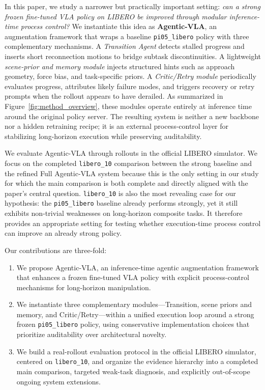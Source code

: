 \documentclass[a4paper]{Template/LaTeX_Templates/waica}
\begin{document}
In this paper, we study a narrower but practically important setting: \emph{can a strong frozen fine-tuned VLA policy on LIBERO be improved through modular inference-time process control?} We instantiate this idea as \textbf{Agentic-VLA}, an augmentation framework that wraps a baseline \texttt{pi05\_libero} policy with three complementary mechanisms. A \textit{Transition Agent} detects stalled progress and inserts short reconnection motions to bridge subtask discontinuities. A lightweight \textit{scene-prior and memory module} injects structured hints such as approach geometry, force bias, and task-specific priors. A \textit{Critic/Retry module} periodically evaluates progress, attributes likely failure modes, and triggers recovery or retry prompts when the rollout appears to have derailed. As summarized in Figure~\ref{fig:method_overview}, these modules operate entirely at inference time around the original policy server. The resulting system is neither a new backbone nor a hidden retraining recipe; it is an external process-control layer for stabilizing long-horizon execution while preserving auditability.

We evaluate Agentic-VLA through rollouts in the official LIBERO simulator. We focus on the completed \texttt{libero\_10} comparison between the strong baseline and the refined Full Agentic-VLA system because this is the only setting in our study for which the main comparison is both complete and directly aligned with the paper's central question. \texttt{libero\_10} is also the most revealing case for our hypothesis: the \texttt{pi05\_libero} baseline already performs strongly, yet it still exhibits non-trivial weaknesses on long-horizon composite tasks. It therefore provides an appropriate setting for testing whether execution-time process control can improve an already strong policy.

Our contributions are three-fold:
\begin{enumerate}
\item We propose Agentic-VLA, an inference-time agentic augmentation framework that enhances a frozen fine-tuned VLA policy with explicit process-control mechanisms for long-horizon manipulation.
\item We instantiate three complementary modules---Transition, scene priors and memory, and Critic/Retry---within a unified execution loop around a strong frozen \texttt{pi05\_libero} policy, using conservative implementation choices that prioritize auditability over architectural novelty.
\item We build a real-rollout evaluation protocol in the official LIBERO simulator, centered on \texttt{libero\_10}, and organize the evidence hierarchy into a completed main comparison, targeted weak-task diagnosis, and explicitly out-of-scope ongoing system extensions.
\end{enumerate}
\end{document}
